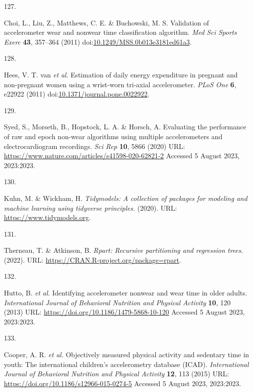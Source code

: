 \documentclass[
  10pt,
]{scrbook}
\newlength{\cslhangindent}
\newlength{\csllabelwidth}
\newlength{\cslentryspacingunit} %
\newenvironment{CSLReferences}[2] %
 {%
  \setlength{\parindent}{0pt}
  \ifodd #1
  \let\oldpar\par
  \def\par{\hangindent=\cslhangindent\oldpar}
  \fi
  \setlength{\parskip}{#2\cslentryspacingunit}
 }%
 {}
\newcommand{\CSLLeftMargin}[1]{\parbox[t]{\csllabelwidth}{#1}}
\newcommand{\CSLRightInline}[1]{\parbox[t]{\linewidth - \csllabelwidth}{#1}\break}
\begin{document}
\begin{CSLReferences}{0}{0}
\leavevmode{}%
\CSLLeftMargin{127. }%
\CSLRightInline{Choi, L., Liu, Z., Matthews, C. E. \& Buchowski, M. S.
Validation of accelerometer wear and nonwear time classification
algorithm. \emph{Med Sci Sports Exerc} \textbf{43}, 357--364 (2011)
doi:\href{https://doi.org/10.1249/MSS.0b013e3181ed61a3}{10.1249/MSS.0b013e3181ed61a3}.}

\leavevmode{}%
\CSLLeftMargin{128. }%
\CSLRightInline{Hees, V. T. van \emph{et al.} Estimation of daily energy
expenditure in pregnant and non-pregnant women using a wrist-worn
tri-axial accelerometer. \emph{{PLoS} One} \textbf{6}, e22922 (2011)
doi:\href{https://doi.org/10.1371/journal.pone.0022922}{10.1371/journal.pone.0022922}.}

\leavevmode{}%
\CSLLeftMargin{129. }%
\CSLRightInline{Syed, S., Morseth, B., Hopstock, L. A. \& Horsch, A.
Evaluating the performance of raw and epoch non-wear algorithms using
multiple accelerometers and electrocardiogram recordings. \emph{Sci Rep}
\textbf{10}, 5866 (2020) URL:
\url{https://www.nature.com/articles/s41598-020-62821-2} Accessed 5
August 2023, 2023:2023.}

\leavevmode{}%
\CSLLeftMargin{130. }%
\CSLRightInline{Kuhn, M. \& Wickham, H. \emph{Tidymodels: A collection
of packages for modeling and machine learning using tidyverse
principles.} (2020). URL: \url{https://www.tidymodels.org}.}

\leavevmode{}%
\CSLLeftMargin{131. }%
\CSLRightInline{Therneau, T. \& Atkinson, B. \emph{Rpart: Recursive
partitioning and regression trees}. (2022). URL:
\url{https://CRAN.R-project.org/package=rpart}.}

\leavevmode{}%
\CSLLeftMargin{132. }%
\CSLRightInline{Hutto, B. \emph{et al.} Identifying accelerometer
nonwear and wear time in older adults. \emph{International Journal of
Behavioral Nutrition and Physical Activity} \textbf{10}, 120 (2013) URL:
\url{https://doi.org/10.1186/1479-5868-10-120} Accessed 5 August 2023,
2023:2023.}

\leavevmode{}%
\CSLLeftMargin{133. }%
\CSLRightInline{Cooper, A. R. \emph{et al.} Objectively measured
physical activity and sedentary time in youth: The international
children's accelerometry database ({ICAD}). \emph{International Journal
of Behavioral Nutrition and Physical Activity} \textbf{12}, 113 (2015)
URL: \url{https://doi.org/10.1186/s12966-015-0274-5} Accessed 5 August
2023, 2023:2023.}


\end{CSLReferences}
\end{document}
